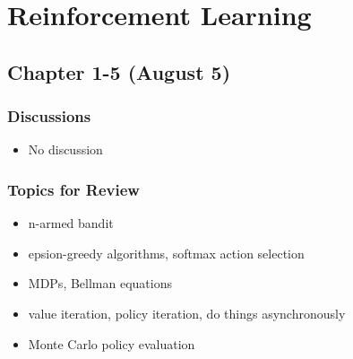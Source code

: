 \section{Reinforcement Learning}

\subsection{Chapter 1-5 (August 5)}

\subsubsection*{Discussions}
\begin{itemize}
\item No discussion
\end{itemize}

\subsubsection*{Topics for Review}
\begin{itemize}
\item n-armed bandit
\item epsion-greedy algorithms, softmax action selection
\item MDPs, Bellman equations
\item value iteration, policy iteration, do things asynchronously
\item Monte Carlo policy evaluation
\end{itemize}
